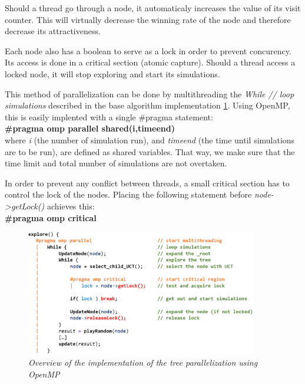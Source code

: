 Should a thread go through a node, it automaticaly increases the value of its visit counter. This will virtually decrease the winning rate of the node and therefore decrease its attractiveness.

Each node also has a boolean to serve as a lock in order to prevent concurency. Its access is done in a critical section (atomic capture). Should a thread access a locked node, it will stop exploring and start its simulations.

This method of parallelization can be done by multithreading the \textit{While // loop simulations} described in the base algorithm implementation \ref{fig:MCTSAlgorithmOMP}. Using OpenMP, this is easily implented with a single \#pragma statement:\\
\textbf{\#pragma omp parallel shared(i,timeend)}\\
where \textit{i} (the number of simulation run), and \textit{timeend} (the time until simulations are to be run), are defined as shared variables. That way, we make sure that the time limit and total number of simulations are not overtaken. 

In order to prevent any conflict between threads, a small critical section has to control the lock of the nodes. Placing the following statement before \textit{node->getLock()} achieves this:\\
\textbf{\#pragma omp critical}

\begin{figure}[H]
\centerline{\includegraphics[width=0.9\textwidth]{Parallelisation/Computer/Img/omp.png}}
\caption{\label{fig:MCTSAlgorithmOMP}\textit{Overview of the implementation of the tree parallelization using OpenMP}}
\end{figure}
